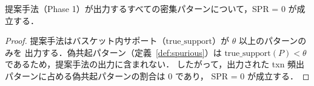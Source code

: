 \begin{proposition}
\label{prop:spr_zero}
提案手法（Phase 1）が出力するすべての密集パターンについて，SPR = 0 が成立する．
\end{proposition}

\begin{proof}
提案手法はバスケット内サポート（$\text{true\_support}$）が $\theta$ 以上のパターンのみを
出力する．偽共起パターン（定義~\ref{def:spurious}）は
$\text{true\_support}(P) < \theta$ であるため，提案手法の出力に含まれない．
したがって，出力された txn 頻出パターンに占める偽共起パターンの割合は 0 であり，
SPR = 0 が成立する．
\end{proof}
